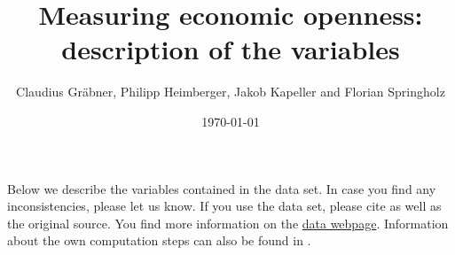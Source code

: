 \documentclass[
	a4paper,
	11pt,
	bibtotoc,
	headings=standardclasses,
  	headings=big]{scrartcl}
\begin{document}
\title{Measuring economic openness: description of the variables}
\author{Claudius Gräbner, Philipp Heimberger, Jakob Kapeller and Florian Springholz}
\date{\today}
\maketitle

Below we describe the variables contained in the data set. 
In case you find any inconsistencies, please let us know.
If you use the data set, please cite \citet{openness} as well as the original source.
You find more information on the \href{https://graebnerc.github.io/webtest/}{data webpage}.
Information about the own computation steps can also be found in \citet{openness}.
\end{document}
